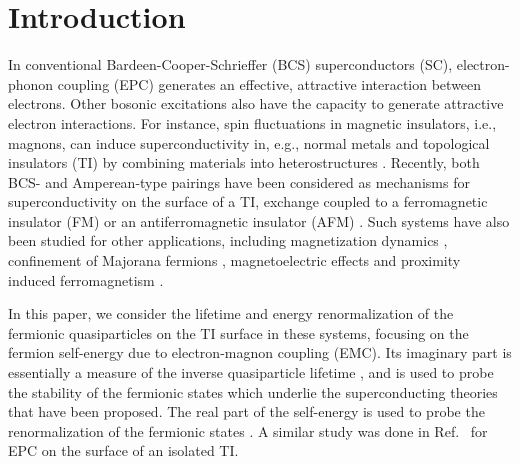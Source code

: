 \documentclass[aps, prb, twocolumn,amsmath,amssymb,floatfix]{revtex4-2}
\begin{document}
\maketitle 



\section{Introduction}
In conventional Bardeen-Cooper-Schrieffer (BCS) \cite{BCS} superconductors (SC), electron-phonon coupling (EPC) generates an effective, attractive interaction between electrons. Other bosonic excitations also have the capacity to generate attractive electron interactions. For instance, spin fluctuations in magnetic insulators, i.e., magnons, can induce superconductivity in, e.g., normal metals and topological insulators (TI) \cite{KaneMele, KaneHasanTI, QiTITSC2011, he2019topological} by combining materials into heterostructures \cite{EirikTIFMAFM, HenningRex, Hugdal5SCTI, LinderSCTI, kargarianprl, FMNMFMArnePRB, AFMNMAFMArnePRB, thingstad2021eliashberg, EirikSqueezed, EirikSchwinger}. Recently, both BCS- and Amperean-type pairings have been considered as mechanisms for superconductivity on the surface of a TI, exchange coupled to a ferromagnetic insulator (FM) or an antiferromagnetic insulator (AFM) \cite{EirikTIFMAFM, HenningRex}. Such systems have also been studied for other applications, including magnetization dynamics \cite{magetizationdynamics}, confinement of Majorana fermions \cite{FuKane2008, TIFMexp}, magnetoelectric effects \cite{TImagnetoelectric} and proximity induced ferromagnetism \cite{TIFMexp}.

In this paper, we consider the lifetime and energy renormalization of the fermionic quasiparticles on the TI surface in these systems, focusing on the fermion self-energy due to electron-magnon coupling (EMC). Its imaginary part is essentially a measure of the inverse quasiparticle lifetime \cite{BruusFlensberg}, and is used to probe the stability of the fermionic states which underlie the superconducting theories that have been proposed. The real part of the self-energy is used to probe the renormalization of the fermionic states \cite{BruusFlensberg}. A similar study was done in Ref.~\cite{GiraudEgger} for EPC on the surface of an isolated TI. %
\end{document}
